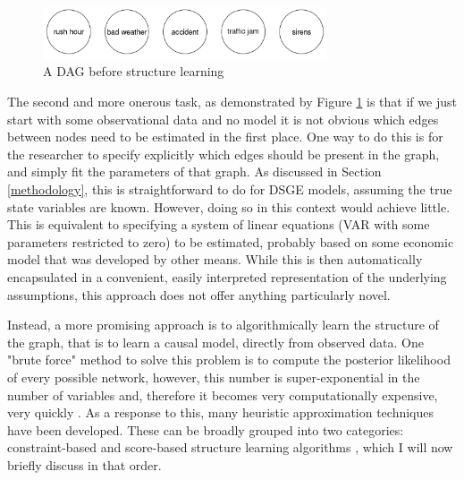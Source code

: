 \documentclass{article}
\begin{document}
\begin{figure}
  \centering
  \includegraphics[width=0.75\textwidth]{images/trafficjam_unfit.png}
  \caption{A DAG before structure learning}
  \label{dag2}
\end{figure}

The second and more onerous task, as demonstrated by Figure \ref{dag2} is that if we just start with some observational data and no model it is not obvious which edges between nodes need to be estimated in the first place. One way to do this is for the researcher to specify explicitly which edges should be present in the graph, and simply fit the parameters of that graph. As discussed in Section \ref{methodology}, this is straightforward to do for DSGE models, assuming the true state variables are known. However, doing so in this context would achieve little. This is equivalent to specifying a system of linear equations (VAR with some parameters restricted to zero) to be estimated, probably based on some economic model that was developed by other means. While this is then automatically encapsulated in a convenient, easily interpreted representation of the underlying assumptions, this approach does not offer anything particularly novel. 

Instead, a more promising approach is to algorithmically learn the structure of the graph, that is to learn a causal model, directly from observed data. One "brute force" method to solve this problem is to compute the posterior likelihood of every possible network, however, this number is super-exponential in the number of variables and, therefore it becomes very computationally expensive, very quickly \parencite{chickering1996learning}. As a response to this, many heuristic approximation techniques have been developed. These can be broadly grouped into two categories: constraint-based and score-based structure learning algorithms \parencite{spirtes1991algorithm} \parencite{verma1991equivalence}, which I will now briefly discuss in that order. 
\end{document}
